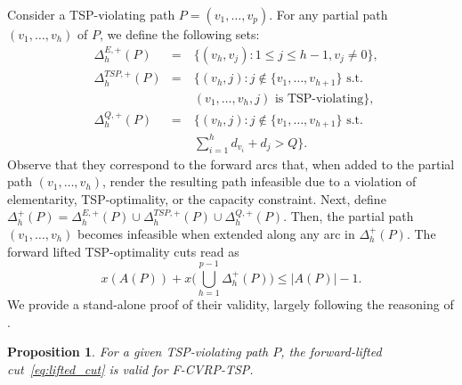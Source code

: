 \documentclass[a4paper,fleqn]{cas-dc}%
\newtheorem{prop}[thm]{Proposition}
\begin{document}
Consider a TSP-violating path $P=(v_1,\ldots,v_p)$. For any partial path $(v_1, \ldots, v_h)$ of $P$, we define the following sets:
\begin{align*}
  &\Delta^{E,+}_{h}(P) &=~&  \big\{(v_h, v_j): 1 \leq j \leq h-1, v_j \neq 0 \big\}, \\[4pt]
  &\Delta^{TSP,+}_{h}(P) &=~& \big\{(v_h,j) : j\notin \{v_1,\ldots,v_{h+1}\} \text{ s.t.} \\
  &&& (v_1,\ldots,v_h,j)\text{ is TSP-violating} \big\}, \\[4pt]
  &\Delta^{Q,+}_{h}(P) &=~& \big\{(v_h,j) : j\notin \{v_1,\ldots,v_{h+1}\} \text{ s.t.} \\
  &&& \textstyle\sum_{i=1}^{h} d_{v_i} + d_j > Q \big\}.
\end{align*}
Observe that they correspond to the forward arcs that, when added to the partial path $(v_1, \ldots, v_h)$, render the resulting path infeasible due to a violation of elementarity, TSP-optimality, or the capacity constraint. Next, define $\Delta^{+}_{h}(P) = \Delta^{E, +}_{h}(P) \cup \Delta^{TSP,+}_{h}(P) \cup \Delta^{Q, +}_{h}(P)$. Then, the partial path $(v_1, \ldots, v_h)$ becomes infeasible when extended along any arc in $\Delta^{+}_{h}(P)$. The forward lifted TSP-optimality cuts read as
\begin{equation}
x(A(P))+ x\!\big(\bigcup_{h=1}^{p-1} \Delta^{+}_{h}(P)\big)\leq |A(P)|-1. \label{eq:lifted_cut}
\end{equation}
We provide a stand-alone proof of their validity, largely following the reasoning of \citet{kallehauge2007path}.
\begin{prop}
For a given TSP-violating path $P$, the forward-lifted cut~\eqref{eq:lifted_cut} is valid for F-CVRP-TSP.
\end{prop}
\end{document}

